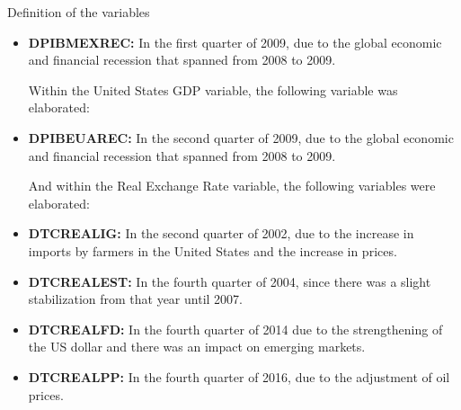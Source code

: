 \begin{frame}{Definition of the variables}
\begin{itemize}
\item	\textbf{DPIBMEXREC:} In the first quarter of 2009, due to the global economic and financial recession that spanned from 2008 to 2009.\par

 Within the United States GDP variable, the following variable was elaborated:\par

\item \textbf{DPIBEUAREC:} In the second quarter of 2009, due to the global economic and financial recession that spanned from 2008 to 2009.\par

And within the Real Exchange Rate variable, the following variables were elaborated:\par

\item \textbf{DTCREALIG:} In the second quarter of 2002, due to the increase in imports by farmers in the United States and the increase in prices.\par
\item \textbf{DTCREALEST:} In the fourth quarter of 2004, since there was a slight stabilization from that year until 2007.\par
\item \textbf{DTCREALFD:} In the fourth quarter of 2014 due to the strengthening of the US dollar and there was an impact on emerging markets.\par
\item \textbf{DTCREALPP:} In the fourth quarter of 2016, due to the adjustment of oil prices.
 \end{itemize}
\end{frame}
